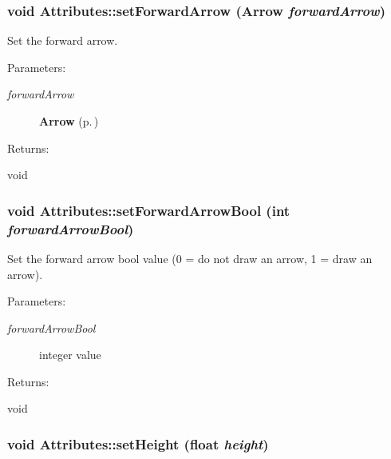 \subsubsection{\setlength{\rightskip}{0pt plus 5cm}void Attributes::set\-Forward\-Arrow ({\bf Arrow} {\em forward\-Arrow})\hspace{0.3cm}{\tt  [inline]}}\label{classAttributes_a15}


Set the forward arrow. \begin{Desc}
\item[Parameters: ]\par
\begin{description}
\item[{\em 
forward\-Arrow}]{\bf Arrow} {\rm (p.\,\pageref{classArrow})} \end{description}
\end{Desc}
\begin{Desc}
\item[Returns: ]\par
void \end{Desc}
\subsubsection{\setlength{\rightskip}{0pt plus 5cm}void Attributes::set\-Forward\-Arrow\-Bool (int {\em forward\-Arrow\-Bool})\hspace{0.3cm}{\tt  [inline]}}\label{classAttributes_a13}


Set the forward arrow bool value (0 = do not draw an arrow, 1 = draw an arrow). \begin{Desc}
\item[Parameters: ]\par
\begin{description}
\item[{\em 
forward\-Arrow\-Bool}]integer value \end{description}
\end{Desc}
\begin{Desc}
\item[Returns: ]\par
void \end{Desc}
\subsubsection{\setlength{\rightskip}{0pt plus 5cm}void Attributes::set\-Height (float {\em height})\hspace{0.3cm}{\tt  [inline]}}\label{classAttributes_a21}


